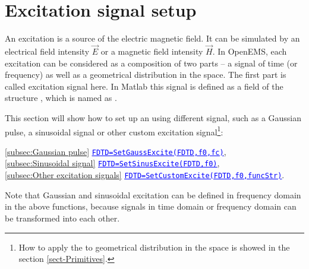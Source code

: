 \section{Excitation signal setup} \label{sec:FDTD_Excitation}
An excitation  is a source of the  electric magnetic field. It can be  simulated by an electrical field intensity $\vec{E}$ or a magnetic field intensity $\vec{H}$. In OpenEMS, each excitation can be considered as a composition  of two parts -- a signal of  time (or  frequency) as well as  a geometrical distribution  in the space. The first part is called excitation signal here.
In Matlab this signal is defined as a field of the structure , which is named as .  \label{para:Excitation}%

This section will show how to set up  an  using different signal, such as a Gaussian pulse, a sinusoidal signal or other custom excitation signal\footnote{How to apply the   to geometrical distribution in the space  is showed in the section \ref{sect-Primitives}.}:
       \begin{myindentpar}
	     \ref{subsec:Gaussian pulse} \hspace{1cm} \hyperref[subsec:Gaussian pulse]{\textcolor{blue}{\underline{\texttt{FDTD=SetGaussExcite(FDTD,f0,fc)}}}}, \\
	      \ref{subsec:Sinusoidal signal} \hspace{1cm} \hyperref[subsec:Sinusoidal signal]{\textcolor{blue}{\underline{\texttt{FDTD=SetSinusExcite(FDTD,f0)}}}},\\
	      \ref{subsec:Other excitation signals} \hspace{1cm} \hyperref[subsec:Other excitation signals]{\textcolor{blue}{\underline{\texttt{FDTD=SetCustomExcite(FDTD,f0,funcStr)}}}}.
       \end{myindentpar}
Note that Gaussian and sinusoidal excitation can be  defined in frequency domain in the above functions, because signals in time domain or frequency domain can be transformed into each other.\\
